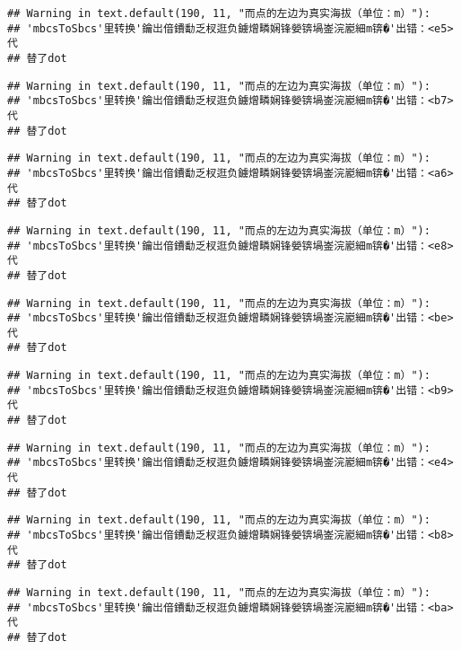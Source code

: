 \documentclass[
]{article}
\begin{document}
\begin{verbatim}
## Warning in text.default(190, 11, "而点的左边为真实海拔（单位：m）"):
## 'mbcsToSbcs'里转换'鑰岀偣鐨勫乏杈逛负鐪熷疄娴锋嫈锛堝崟浣嶏細m锛�'出错：<e5>代
## 替了dot
\end{verbatim}

\begin{verbatim}
## Warning in text.default(190, 11, "而点的左边为真实海拔（单位：m）"):
## 'mbcsToSbcs'里转换'鑰岀偣鐨勫乏杈逛负鐪熷疄娴锋嫈锛堝崟浣嶏細m锛�'出错：<b7>代
## 替了dot
\end{verbatim}

\begin{verbatim}
## Warning in text.default(190, 11, "而点的左边为真实海拔（单位：m）"):
## 'mbcsToSbcs'里转换'鑰岀偣鐨勫乏杈逛负鐪熷疄娴锋嫈锛堝崟浣嶏細m锛�'出错：<a6>代
## 替了dot
\end{verbatim}

\begin{verbatim}
## Warning in text.default(190, 11, "而点的左边为真实海拔（单位：m）"):
## 'mbcsToSbcs'里转换'鑰岀偣鐨勫乏杈逛负鐪熷疄娴锋嫈锛堝崟浣嶏細m锛�'出错：<e8>代
## 替了dot
\end{verbatim}

\begin{verbatim}
## Warning in text.default(190, 11, "而点的左边为真实海拔（单位：m）"):
## 'mbcsToSbcs'里转换'鑰岀偣鐨勫乏杈逛负鐪熷疄娴锋嫈锛堝崟浣嶏細m锛�'出错：<be>代
## 替了dot
\end{verbatim}

\begin{verbatim}
## Warning in text.default(190, 11, "而点的左边为真实海拔（单位：m）"):
## 'mbcsToSbcs'里转换'鑰岀偣鐨勫乏杈逛负鐪熷疄娴锋嫈锛堝崟浣嶏細m锛�'出错：<b9>代
## 替了dot
\end{verbatim}

\begin{verbatim}
## Warning in text.default(190, 11, "而点的左边为真实海拔（单位：m）"):
## 'mbcsToSbcs'里转换'鑰岀偣鐨勫乏杈逛负鐪熷疄娴锋嫈锛堝崟浣嶏細m锛�'出错：<e4>代
## 替了dot
\end{verbatim}

\begin{verbatim}
## Warning in text.default(190, 11, "而点的左边为真实海拔（单位：m）"):
## 'mbcsToSbcs'里转换'鑰岀偣鐨勫乏杈逛负鐪熷疄娴锋嫈锛堝崟浣嶏細m锛�'出错：<b8>代
## 替了dot
\end{verbatim}

\begin{verbatim}
## Warning in text.default(190, 11, "而点的左边为真实海拔（单位：m）"):
## 'mbcsToSbcs'里转换'鑰岀偣鐨勫乏杈逛负鐪熷疄娴锋嫈锛堝崟浣嶏細m锛�'出错：<ba>代
## 替了dot
\end{verbatim}
\end{document}
